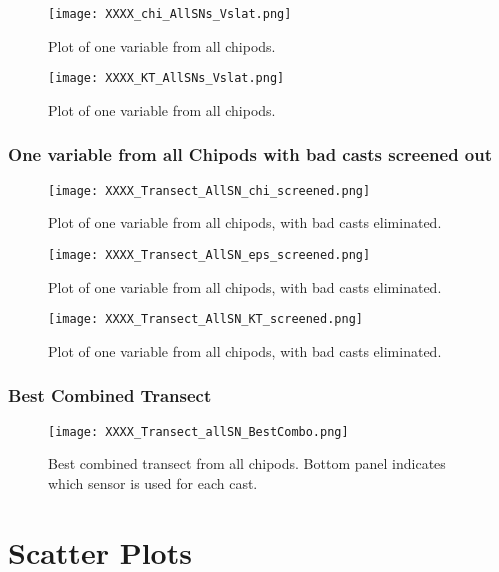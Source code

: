\documentclass[11pt]{article}
\begin{document}
\begin{figure}[htbp]
\texttt{[image: XXXX\_chi\_AllSNs\_Vslat.png]}
\caption{Plot of one variable from all chipods.}
\label{}
\end{figure}

\begin{figure}[htbp]
\texttt{[image: XXXX\_KT\_AllSNs\_Vslat.png]}
\caption{Plot of one variable from all chipods.}
\label{}
\end{figure}



\clearpage
\newpage
\subsubsection{One variable from all Chipods with bad casts screened out}


\begin{figure}[htbp]
\texttt{[image: XXXX\_Transect\_AllSN\_chi\_screened.png]}
\caption{Plot of one variable from all chipods, with bad casts eliminated.}
\label{}
\end{figure}

\begin{figure}[htbp]
\texttt{[image: XXXX\_Transect\_AllSN\_eps\_screened.png]}
\caption{Plot of one variable from all chipods, with bad casts eliminated.}
\label{}
\end{figure}


\begin{figure}[htbp]
\texttt{[image: XXXX\_Transect\_AllSN\_KT\_screened.png]}
\caption{Plot of one variable from all chipods, with bad casts eliminated.}
\label{}
\end{figure}



\clearpage
\newpage
\subsubsection{Best Combined Transect}


\begin{figure}[htbp]
\texttt{[image: XXXX\_Transect\_allSN\_BestCombo.png]}
\caption{Best combined transect from all chipods. Bottom panel indicates which sensor is used for each cast.}
\label{}
\end{figure}




\clearpage
\newpage
\section{Scatter Plots}
\end{document}
